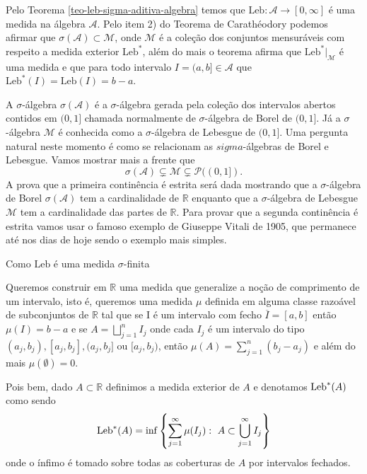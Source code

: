 Pelo Teorema \ref{teo-leb-sigma-aditiva-algebra} 
temos que $\mathrm{Leb}:\mathcal{A}\to [0,\infty]$
é uma medida na álgebra $\mathcal{A}$.
Pelo item 2) do Teorema de Carathéodory podemos
afirmar que  $\sigma(\mathcal{A})\subset \mathcal{M}$,
onde $\mathcal{M}$ é a coleção dos conjuntos 
mensuráveis com respeito a 
medida exterior $\mathrm{Leb}^*$,
além do mais o teorema afirma que $\mathrm{Leb}^*\big|_{\mathcal{M}}$
é uma medida e que para todo intervalo $I=(a,b]\in\mathcal{A}$ 
que $\mathrm{Leb}^*(I)=\mathrm{Leb}(I)=b-a$.

A $\sigma$-álgebra $\sigma(\mathcal{A})$ é a $\sigma$-álgebra
gerada pela coleção dos intervalos abertos contidos em $(0,1]$
chamada normalmente de $\sigma$-álgebra de Borel de $(0,1]$.
Já a $\sigma$-álgebra $\mathcal{M}$ é conhecida
como a $\sigma$-álgebra de Lebesgue de $(0,1]$.
Uma pergunta natural neste momento é como se relacionam 
as $sigma$-álgebras de Borel e Lebesgue. Vamos mostrar 
mais a frente que 
\[
\sigma(\mathcal{A})
\subsetneq 
\mathcal{M}
\subsetneq 
\mathcal{P}((0,1]).
\]
A prova que a primeira continência é estrita 
será dada mostrando que a $\sigma$-álgebra 
de Borel $\sigma(\mathcal{A})$ 
tem a cardinalidade de $\mathbb{R}$ 
enquanto que a $\sigma$-álgebra de Lebesgue 
$\mathcal{M}$ tem a cardinalidade das 
partes de $\mathbb{R}$.
Para provar que a segunda continência é estrita
vamos usar o famoso exemplo de Giuseppe Vitali
de 1905, que permanece até nos dias de hoje 
sendo o exemplo mais simples.

Como $\mathrm{Leb}$ é uma medida $\sigma$-finita 



Queremos construir em $\mathbb{R}$ uma medida que 
generalize a noção de comprimento de  
um intervalo, isto é, queremos uma medida  
$\mu$ definida em alguma classe razoável de 
subconjuntos de $\mathbb{R}$ tal que se I é um intervalo
com fecho $\overline{I}=[a,b]$ então $\mu(I)=b-a$ 
e se $A=\bigsqcup_{j=1}^nI_j$ onde cada $I_j$ 
é um intervalo do tipo $(a_j,b_j), [a_j,b_j],(a_j,b_j]$ ou $[a_j,b_j)$,  
então $\mu(A)=\sum_{j=1}^n(b_j-a_j)$ e
além do mais $\mu(\emptyset)=0$.



Pois bem, dado $A\subset \mathbb{R}$ 
definimos a medida exterior de $A$ e 
denotamos $\textnormal{Leb}^{*}(A)$ como sendo 
$$
\textnormal{Leb}^{*}(A)=\inf 
				\left\{
					\sum_{j=1}^\infty \mu(I_j):~ A\subset \bigcup_{j=1}^\infty I_j 
				\right\}
$$
onde o ínfimo é tomado sobre todas as coberturas de $A$ por intervalos fechados.  

